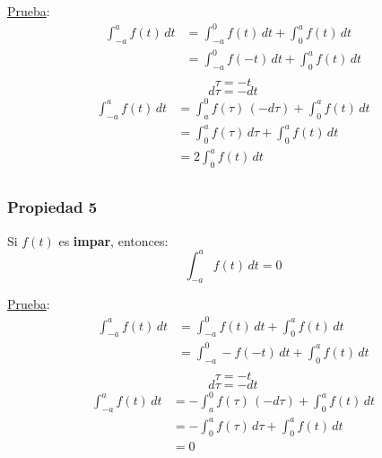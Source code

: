 \begin{figure}[H]
    \centering
    
\end{figure}

\underline{Prueba}:
\begin{equation*}
\begin{split}
    \int_{-a}^a f(t)\,dt
        &=\int_{-a}^0 f(t)\,dt+\int_0^a f(t)\,dt\\
        &=\int_{-a}^0 f(-t)\,dt+\int_0^a f(t)\,dt\\
\end{split}
\end{equation*}
\begin{equation*}
    \tau=-t
\end{equation*}
\begin{equation*}
    d\tau=-dt
\end{equation*}
\begin{equation*}
\begin{split}
    \int_{-a}^a f(t)\,dt
        &=\int_a^0 f(\tau)\,(-d\tau)+\int_0^a f(t)\,dt\\
        &=\int_0^a f(\tau)\,d\tau+\int_0^a f(t)\,dt\\
        &=2\int_0^a f(t)\,dt\\
\end{split}
\end{equation*}

\subsubsection*{Propiedad 5}
Si $f(t)$ es \textbf{impar}, entonces:
\begin{equation}
    \int_{-a}^a f(t)\,dt=0
\end{equation}

\begin{figure}[H]
    \centering
    
\end{figure}

\underline{Prueba}:
\begin{equation*}
\begin{split}
    \int_{-a}^a f(t)\,dt
        &=\int_{-a}^0 f(t)\,dt+\int_0^a f(t)\,dt\\
        &=\int_{-a}^0 -f(-t)\,dt+\int_0^a f(t)\,dt\\
\end{split}
\end{equation*}
\begin{equation*}
    \tau=-t
\end{equation*}
\begin{equation*}
    d\tau=-dt
\end{equation*}
\begin{equation*}
\begin{split}
    \int_{-a}^a f(t)\,dt
        &=-\int_a^0 f(\tau)\,(-d\tau)+\int_0^a f(t)\,dt\\
        &=-\int_0^a f(\tau)\,d\tau+\int_0^a f(t)\,dt\\
        &=0\\
\end{split}
\end{equation*}

